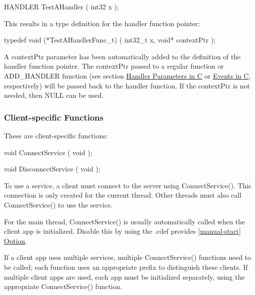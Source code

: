 \begin{DoxyVerb}HANDLER TestAHandler
(
    int32 x
);
\end{DoxyVerb}


This results in a type definition for the handler function pointer\+:

\begin{DoxyVerb}typedef void (*TestAHandlerFunc_t)
(
    int32_t x,
    void* contextPtr
);
\end{DoxyVerb}


A {\ttfamily context\+Ptr} parameter has been automatically added to the definition of the handler function pointer. The {\ttfamily context\+Ptr} passed to a regular function or A\+D\+D\+\_\+\+H\+A\+N\+D\+L\+E\+R function (see section \hyperlink{interface_def_lang_c_interfaceDefLangC_handlerParm}{Handler Parameters in C} or \hyperlink{interface_def_lang_c_interfaceDefLangC_event}{Events in C}, respectively) will be passed back to the handler function. If the {\ttfamily context\+Ptr} is not needed, then N\+U\+L\+L can be used.\hypertarget{interface_def_lang_c_interfaceDefLangC_client}{}\subsubsection{Client-\/specific Functions}\label{interface_def_lang_c_interfaceDefLangC_client}
These are client-\/specific functions\+:

\begin{DoxyVerb}void ConnectService
(
    void
);

void DisconnectService
(
    void
);
\end{DoxyVerb}


To use a service, a client must connect to the server using {\ttfamily Connect\+Service()}. This connection is only created for the current thread. Other threads must also call Connect\+Service() to use the service.

For the main thread, {\ttfamily Connect\+Service()} is usually automatically called when the client app is initialized. Disable this by using the .cdef provides \hyperlink{def_files_cdef_defFilesCdef_providesApiManualStart}{\mbox{[}manual-\/start\mbox{]} Option}.

If a client app uses multiple services, multiple {\ttfamily Connect\+Service()} functions need to be called; each function uses an appropriate prefix to distinguish these clients. If multiple client apps are used, each app must be initialized separately, using the appropriate Connect\+Service() function.

